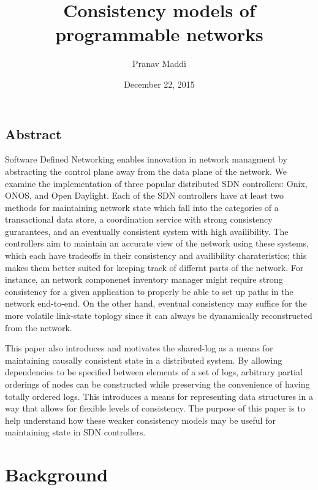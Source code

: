 \documentclass[letterpaper,twocolumn,10pt]{article}
\begin{document}
\title{\Large Consistency models of programmable networks}

\author{Pranav Maddi}

\date{December 22, 2015}
\maketitle

\tableofcontents

\subsection*{Abstract}

Software Defined Networking enables innovation in network managment by abstracting the control plane away from the data plane of the network. We examine the implementation of three popular distributed SDN controllers: Onix, ONOS, and Open Daylight. Each of the SDN controllers have at least two methods for maintaining network state which fall into the categories of a transactional data store, a coordination service with strong consistency gurarantees, and an eventually consistent system with high availibility. The controllers aim to maintain an accurate view of the network using these systems, which each have tradeoffs in their consistency and availibility charateristics; this makes them better suited for keeping track of differnt parts of the network. For instance, an network componenet inventory manager might require strong consistency for a given application to properly be able to set up paths in the network end-to-end. On the other hand, eventual consistency may suffice for the more volatile link-state toplogy since it can always be dyanamically reconstructed from the network.

This paper also introduces and motivates the shared-log as a means for maintaining causally consistent state in a distributed system. By allowing dependencies to be specified between elements of a set of logs, arbitrary partial orderings of nodes can be constructed while preserving the convenience of having totally ordered logs. This introduces a means for representing data structures in a way that allows for flexible levels of consistency. The purpose of this paper is to help understand how these weaker consistency models may be useful for maintaining state in SDN controllers. 

\section{Background}
\end{document}
